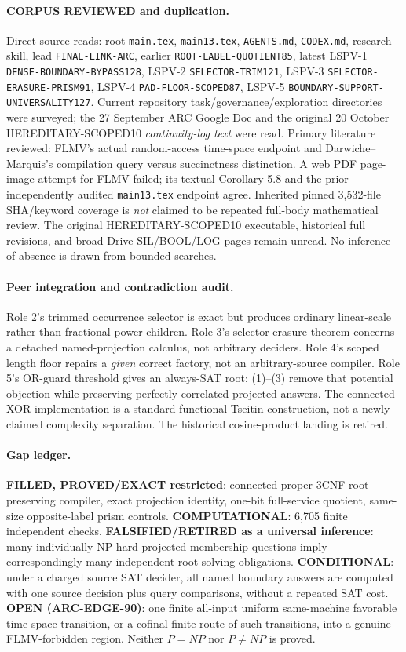 \documentclass[11pt]{article}
\begin{document}
\paragraph{CORPUS REVIEWED and duplication.}
Direct source reads: root \texttt{main.tex}, \texttt{main13.tex},
\texttt{AGENTS.md}, \texttt{CODEX.md}, research skill,
lead \texttt{FINAL-LINK-ARC}, earlier
\texttt{ROOT-LABEL-QUOTIENT85}, latest LSPV-1
\texttt{DENSE-BOUNDARY-BYPASS128}, LSPV-2
\texttt{SELECTOR-TRIM121}, LSPV-3
\texttt{SELECTOR-ERASURE-PRISM91}, LSPV-4
\texttt{PAD-FLOOR-SCOPED87}, LSPV-5
\texttt{BOUNDARY-SUPPORT-UNIVERSALITY127}.
Current repository task/governance/exploration directories were
surveyed; the 27 September ARC Google Doc and the original
20 October HEREDITARY-SCOPED10 \emph{continuity-log text} were
read. Primary literature reviewed: FLMV's actual random-access
time-space endpoint and Darwiche--Marquis's compilation query versus
succinctness distinction. A web PDF page-image attempt for FLMV
failed; its textual Corollary 5.8 and the prior independently audited
\texttt{main13.tex} endpoint agree. Inherited pinned 3,532-file
SHA/keyword coverage is \emph{not} claimed to be repeated full-body
mathematical review. The original HEREDITARY-SCOPED10 executable,
historical full revisions, and broad Drive SIL/BOOL/LOG pages remain
unread. No inference of absence is drawn from bounded searches.

\paragraph{Peer integration and contradiction audit.}
Role 2's trimmed occurrence selector is exact but produces ordinary
linear-scale rather than fractional-power children. Role 3's selector
erasure theorem concerns a detached named-projection calculus,
not arbitrary deciders. Role 4's scoped length floor repairs a
\emph{given} correct factory, not an arbitrary-source compiler.
Role 5's OR-guard threshold gives an always-SAT root; (1)--(3)
remove that potential objection while preserving perfectly correlated
projected answers. The connected-XOR implementation is a standard
functional Tseitin construction, not a newly claimed complexity
separation. The historical cosine-product landing is retired.

\paragraph{Gap ledger.}
\textbf{FILLED, PROVED/EXACT restricted}: connected proper-3CNF
root-preserving compiler, exact projection identity, one-bit
full-service quotient, same-size opposite-label prism controls.
\textbf{COMPUTATIONAL}: 6,705 finite independent checks.
\textbf{FALSIFIED/RETIRED as a universal inference}:
many individually NP-hard projected membership questions imply
correspondingly many independent root-solving obligations.
\textbf{CONDITIONAL}: under a charged source SAT decider, all named
boundary answers are computed with one source decision plus query
comparisons, without a repeated SAT cost.
\textbf{OPEN (ARC-EDGE-90)}: one finite all-input uniform
same-machine favorable time-space transition, or a cofinal finite
route of such transitions, into a genuine FLMV-forbidden region.
Neither $P=NP$ nor $P\ne NP$ is proved.
\end{document}
